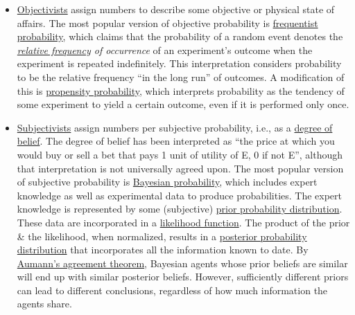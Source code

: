 \documentclass{article}
\begin{document}
\begin{itemize}
	\item \href{https://en.wikipedia.org/wiki/Objectivity_(philosophy)}{Objectivists} assign numbers to describe some objective or physical state of affairs. The most popular version of objective probability is \href{https://en.wikipedia.org/wiki/Frequentist_probability}{frequentist probability}, which claims that the probability of a random event denotes the {\it\href{https://en.wikipedia.org/wiki/Frequency_(statistics)}{relative frequency} of occurrence} of an experiment's outcome when the experiment is repeated indefinitely. This interpretation considers probability to be the relative frequency ``in the long run'' of outcomes. A modification of this is \href{https://en.wikipedia.org/wiki/Propensity_probability}{propensity probability}, which interprets probability as the tendency of some experiment to yield a certain outcome, even if it is performed only once.
	\item \href{https://en.wikipedia.org/wiki/Subjective_probability#Objective_and_subjective_Bayesian_probabilities}{Subjectivists} assign numbers per subjective probability, i.e., as a \href{https://en.wikipedia.org/wiki/Credence_(statistics)}{degree of belief}. The degree of belief has been interpreted as ``the price at which you would buy or sell a bet that pays 1 unit of utility of E, 0 if not E'', although that interpretation is not universally agreed upon. The most popular version of subjective probability is \href{https://en.wikipedia.org/wiki/Bayesian_probability}{Bayesian probability}, which includes expert knowledge as well as experimental data to produce probabilities. The expert knowledge is represented by some (subjective) \href{https://en.wikipedia.org/wiki/Prior_probability_distribution}{prior probability distribution}. These data are incorporated in a \href{https://en.wikipedia.org/wiki/Likelihood_function}{likelihood function}. The product of the prior \& the likelihood, when normalized, results in a \href{https://en.wikipedia.org/wiki/Posterior_probability_distribution}{posterior probability distribution} that incorporates all the information known to date. By \href{https://en.wikipedia.org/wiki/Aumann%27s_agreement_theorem}{Aumann's agreement theorem}, Bayesian agents whose prior beliefs are similar will end up with similar posterior beliefs. However, sufficiently different priors can lead to different conclusions, regardless of how much information the agents share.
\end{itemize}
\end{document}
